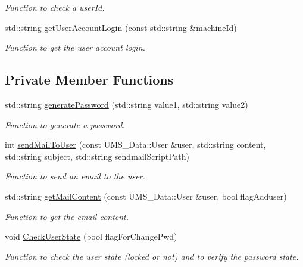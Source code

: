 \begin{DoxyCompactItemize}
\begin{DoxyCompactList}\small\item\em Function to check a userId. \item\end{DoxyCompactList}\item 
std::string \hyperlink{classUserServer_a9ad90b441d2caa41be086f046bc58d62}{getUserAccountLogin} (const std::string \&machineId)
\begin{DoxyCompactList}\small\item\em Function to get the user account login. \item\end{DoxyCompactList}\end{DoxyCompactItemize}
\subsection*{Private Member Functions}
\begin{DoxyCompactItemize}
\item 
std::string \hyperlink{classUserServer_a61f17775588f641c30035349e5e8bfef}{generatePassword} (std::string value1, std::string value2)
\begin{DoxyCompactList}\small\item\em Function to generate a password. \item\end{DoxyCompactList}\item 
int \hyperlink{classUserServer_ac4e5db25963346be0bc57f5b61a1ad59}{sendMailToUser} (const UMS\_\-Data::User \&user, std::string content, std::string subject, std::string sendmailScriptPath)
\begin{DoxyCompactList}\small\item\em Function to send an email to the user. \item\end{DoxyCompactList}\item 
std::string \hyperlink{classUserServer_a4896a5d7bd51b8ad24cf6864ba400487}{getMailContent} (const UMS\_\-Data::User \&user, bool flagAdduser)
\begin{DoxyCompactList}\small\item\em Function to get the email content. \item\end{DoxyCompactList}\item 
void \hyperlink{classUserServer_aeba9bcdce19abb3b8f73b217efb60352}{CheckUserState} (bool flagForChangePwd)
\begin{DoxyCompactList}\small\item\em Function to check the user state (locked or not) and to verify the password state. \item\end{DoxyCompactList}\end{DoxyCompactItemize}
